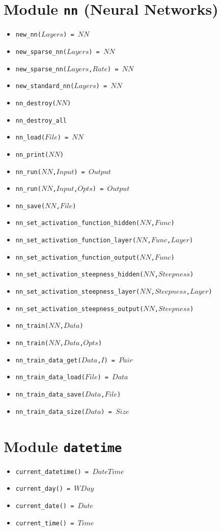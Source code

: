 \documentclass[10pt]{article}
\newcommand{\ignore}[1]{}
\begin{document}
\begin{multicols}{2}
\section*{Module \texttt{nn} (Neural Networks)}
\begin{scriptsize}
\begin{itemize}
\item \texttt{new\_nn($Layers$) = $NN$}
\item \texttt{new\_sparse\_nn($Layers$) = $NN$}
\item \texttt{new\_sparse\_nn($Layers$,$Rate$) = $NN$}
\item \texttt{new\_standard\_nn($Layers$) = $NN$}
\item \texttt{nn\_destroy($NN$)}
\item \texttt{nn\_destroy\_all}
\item \texttt{nn\_load($File$) = $NN$}
\item \texttt{nn\_print($NN$)}
\item \texttt{nn\_run($NN$,$Input$) = $Output$}
\item \texttt{nn\_run($NN$,$Input$,$Opts$) = $Output$}
\item \texttt{nn\_save($NN$,$File$)}
\item \texttt{nn\_set\_activation\_function\_hidden($NN$,$Func$)}
\item \texttt{nn\_set\_activation\_function\_layer($NN$,$Func$,$Layer$)}
\item \texttt{nn\_set\_activation\_function\_output($NN$,$Func$)}
\item \texttt{nn\_set\_activation\_steepness\_hidden($NN$,$Steepness$)}
\item \texttt{nn\_set\_activation\_steepness\_layer($NN$,$Steepness$,$Layer$)}
\item \texttt{nn\_set\_activation\_steepness\_output($NN$,$Steepness$)}
\item \texttt{nn\_train($NN$,$Data$)}
\item \texttt{nn\_train($NN$,$Data$,$Opts$)}
\item \texttt{nn\_train\_data\_get($Data$,$I$) = $Pair$}
\item \texttt{nn\_train\_data\_load($File$) = $Data$}
\item \texttt{nn\_train\_data\_save($Data$,$File$)}
\item \texttt{nn\_train\_data\_size($Data$) = $Size$}
\end{itemize}
\end{scriptsize}
\section*{Module \texttt{datetime}}  
\begin{scriptsize}
\begin{itemize}
\item \texttt{current\_datetime() = $DateTime$}
\item \texttt{current\_day() = $WDay$}
\item \texttt{current\_date() = $Date$}
\item \texttt{current\_time() = $Time$}
\end{itemize}
\end{scriptsize}
\ignore{
}
\end{multicols}
\end{document}
